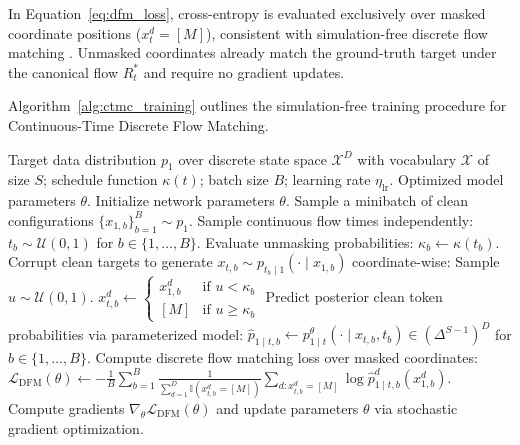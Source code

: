 In Equation~\ref{eq:dfm_loss}, cross-entropy is evaluated exclusively over masked coordinate positions ($x_t^d = [M]$), consistent with simulation-free discrete flow matching \citep{Campbell2024}. Unmasked coordinates already match the ground-truth target under the canonical flow $R_t^*$ and require no gradient updates.

Algorithm~\ref{alg:ctmc_training} outlines the simulation-free training procedure for Continuous-Time Discrete Flow Matching.

\begin{algorithm}[!ht]
\caption{Continuous-Time Discrete Flow Matching (CTMC) Training}
\label{alg:ctmc_training}
\begin{algorithmic}[1]
\Require Target data distribution $p_1$ over discrete state space $\mathcal{X}^D$ with vocabulary $\mathcal{X}$ of size $S$; schedule function $\kappa(t)$; batch size $B$; learning rate $\eta_{\text{lr}}$.
\Ensure Optimized model parameters $\theta$.
\State Initialize network parameters $\theta$.
    \State Sample a minibatch of clean configurations $\{x_{1, b}\}_{b=1}^B \sim p_1$.
    \State Sample continuous flow times independently: $t_b \sim \mathcal{U}(0, 1)$ for $b \in \{1, \dots, B\}$.
    \State Evaluate unmasking probabilities: $\kappa_b \gets \kappa(t_b)$.
    \State Corrupt clean targets to generate $x_{t, b} \sim p_{t_b \mid 1}(\cdot \mid x_{1, b})$ coordinate-wise:
            \State Sample $u \sim \mathcal{U}(0, 1)$.
            \State $x_{t, b}^d \gets \begin{cases} x_{1, b}^d & \text{if } u < \kappa_b \\ [M] & \text{if } u \ge \kappa_b \end{cases}$
        \EndFor
    \EndFor
    \State Predict posterior clean token probabilities via parameterized model:
    \State $\hat{p}_{1 \mid t, b} \gets p_{1 \mid t}^\theta(\cdot \mid x_{t, b}, t_b) \in (\Delta^{S-1})^D$ for $b \in \{1, \dots, B\}$.
    \State Compute discrete flow matching loss over masked coordinates:
    \State $\mathcal{L}_{\text{DFM}}(\theta) \gets - \frac{1}{B} \sum_{b=1}^B \frac{1}{\sum_{d=1}^D \mathbb{I}(x_{t, b}^d = [M])} \sum_{d: x_{t, b}^d = [M]} \log \hat{p}_{1 \mid t, b}^d(x_{1, b}^d)$.
    \State Compute gradients $\nabla_\theta \mathcal{L}_{\text{DFM}}(\theta)$ and update parameters $\theta$ via stochastic gradient optimization.
\EndWhile
\end{algorithmic}
\end{algorithm}

